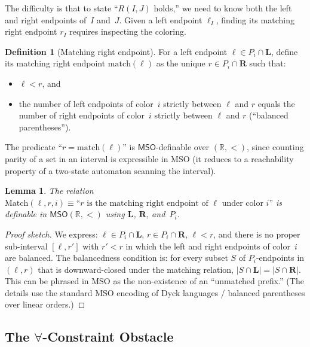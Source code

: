 \documentclass[a4paper,11pt]{article}
\newtheorem{lemma}[theorem]{Lemma}
\theoremstyle{definition}
\newtheorem{definition}[theorem]{Definition}
\newcommand{\MSO}{\ensuremath{\mathsf{MSO}}}
\newcommand{\reals}{\ensuremath{\mathbb{R}}}
\begin{document}
The difficulty is that to state ``$R(I, J)$ holds,'' we need to
know both the left and right endpoints of~$I$ and~$J$.  Given a
left endpoint $\ell_I$, finding its matching right endpoint $r_I$
requires inspecting the coloring.

\begin{definition}[Matching right endpoint]
\label{def:match}
For a left endpoint $\ell \in P_i \cap \mathbf{L}$, define its
matching right endpoint $\mathrm{match}(\ell)$ as the unique
$r \in P_i \cap \mathbf{R}$ such that:
\begin{itemize}[nosep]
  \item $\ell < r$, and
  \item the number of left endpoints of color~$i$ strictly between
    $\ell$ and $r$ equals the number of right endpoints of color~$i$
    strictly between $\ell$ and $r$ (``balanced parentheses'').
\end{itemize}
\end{definition}

The predicate ``$r = \mathrm{match}(\ell)$'' is
$\MSO$-definable over $(\reals, <)$, since counting parity of a set
in an interval is expressible in MSO (it reduces to a reachability
property of a two-state automaton scanning the interval).

\begin{lemma}
\label{lem:match-mso}
The relation $\mathrm{Match}(\ell, r, i) \equiv
\text{``$r$ is the matching right endpoint of $\ell$ under
color~$i$''}$ is definable in $\MSO(\reals, <)$ using $\mathbf{L}$,
$\mathbf{R}$, and~$P_i$.
\end{lemma}

\begin{proof}[Proof sketch]
We express: $\ell \in P_i \cap \mathbf{L}$, $r \in P_i \cap
\mathbf{R}$, $\ell < r$, and there is no proper sub-interval
$[\ell, r']$ with $r' < r$ in which the left and right endpoints of
color~$i$ are balanced.  The balancedness condition is: for every
subset $S$ of $P_i$-endpoints in $(\ell, r)$ that is downward-closed
under the matching relation, $|S \cap \mathbf{L}| = |S \cap
\mathbf{R}|$.  This can be phrased in MSO as the non-existence of
an ``unmatched prefix.''  (The details use the standard MSO
encoding of Dyck languages / balanced parentheses over linear
orders.)
\end{proof}

\subsection{The $\forall$-Constraint Obstacle}
\label{sec:forall-obstacle}
\end{document}
